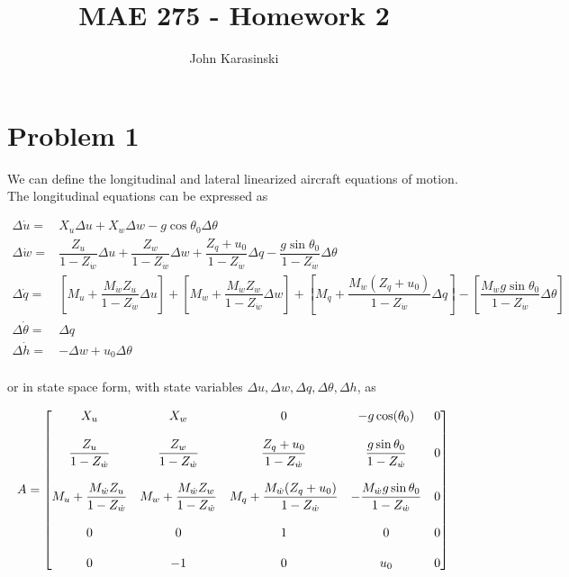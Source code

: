 \documentclass[12pt]{article}
\title{MAE 275 - Homework 2}
\author{John Karasinski}
\begin{document}
\maketitle

\section{Problem 1}
We can define the longitudinal and lateral linearized aircraft equations of motion. The longitudinal equations can be expressed as

\begin{equation*}
\begin{split}
\Delta \dot{u} = &X_u \Delta u + X_w \Delta w - g\cos \theta_0 \Delta \theta \\
\Delta \dot{w} = &\dfrac{Z_u}{1-Z_{\dot{w}}} \Delta u +
                  \dfrac{Z_w}{1-Z_{\dot{w}}} \Delta w +
                  \dfrac{Z_q + u_0}{1-Z_{\dot{w}}} \Delta q -
                  \dfrac{g\sin \theta_0}{1-Z_{\dot{w}}} \Delta \theta \\
\Delta \dot{q} = &\left[ M_u + \dfrac{M_{\dot{w}} Z_u}{1-Z_{\dot{w}}} \Delta u  \right] +
                  \left[ M_w + \dfrac{M_{\dot{w}} Z_w}{1-Z_{\dot{w}}} \Delta w  \right] +
                  \left[ M_q + \dfrac{M_{\dot{w}} (Z_q + u_0)}{1-Z_{\dot{w}}} \Delta q  \right] -\left[ \dfrac{M_{\dot{w}} g\sin \theta_0}{1-Z_{\dot{w}}} \Delta \theta  \right] \\
\Delta \dot{\theta} = &\Delta q \\
\Delta \dot{h} = &-\Delta w + u_0 \Delta \theta \\
\end{split}
\end{equation*}

\noindent or in state space form, with state variables $\Delta u, \Delta w, \Delta q, \Delta \theta, \Delta h $, as

\begin{equation*}
A =
\begin{bmatrix}
    X_u & X_w & 0 & -g \cos(\theta_0) & 0 \\
    \\
    \dfrac{Z_u}{1-Z_{\dot{w}}} & \dfrac{Z_w}{1-Z_{\dot{w}}} & \dfrac{Z_q + u_0}{1-Z_{\dot{w}}} & \dfrac{g\sin \theta_0}{1-Z_{\dot{w}}} & 0 \\
    \\
    M_u + \dfrac{M_{\dot{w}} Z_u}{1-Z_{\dot{w}}} & M_w + \dfrac{M_{\dot{w}} Z_w}{1-Z_{\dot{w}}} & M_q + \dfrac{M_{\dot{w}} (Z_q + u_0)}{1-Z_{\dot{w}}} & -\dfrac{M_{\dot{w}} g\sin \theta_0}{1-Z_{\dot{w}}} & 0 \\
    \\
    0 & 0 & 1 & 0 & 0 \\
    \\
    0 & -1 & 0 & u_0 & 0
\end{bmatrix}\\
\end{equation*}
\end{document}
